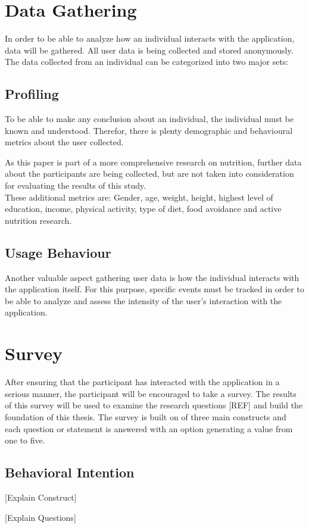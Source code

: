 \section{Data Gathering}
In order to be able to analyze how an individual interacts with the application, data will be gathered. All user data is being collected and stored anonymously. The data collected from an individual can be categorized into two major sets:

\subsection{Profiling}
To be able to make any conclusion about an individual, the individual must be known and understood. Therefor, there is plenty demographic and behavioural metrics about the user collected.


As this paper is part of a more comprehensive research on nutrition, further data about the participants are being collected, but are not taken into consideration for evaluating the results of this study. \\
These additional metrics are: Gender, age, weight, height, highest level of education, income, physical activity, type of diet, food avoidance and active nutrition research.

\subsection{Usage Behaviour}
Another valuable aspect gathering user data is how the individual interacts with the application itself. For this purpose, specific events must be tracked in order to be able to analyze and assess the intensity of the user's interaction with the application.


\section{Survey}
After ensuring that the participant has interacted with the application in a serious manner, the participant will be encouraged to take a survey. The results of this survey will be used to examine the research questions [REF] and build the foundation of this thesis. The survey is built on of three main constructs and each question or statement is answered with an option generating a value from one to five.

\subsection{Behavioral Intention}
[Explain Construct]

[Explain Questions]

